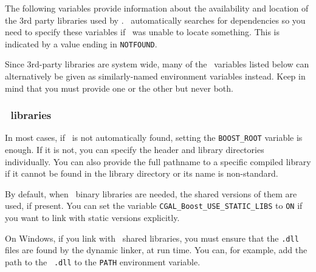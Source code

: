 The following variables provide information about the availability and
location of the 3rd party libraries used by \cgal. \cmake\ automatically
searches for dependencies so you need to specify these variables if 
\cmake\ was unable to locate something. This is indicated by a value ending in
\texttt{NOTFOUND}.

Since 3rd-party libraries are system wide, many of the \cmake\ variables listed below can alternatively
be given as similarly-named environment variables instead. Keep in mind that you must provide one or the
other but never both.

\subsubsection{\boost\ libraries}

In most cases, if \boost\ is not automatically found, setting the \texttt{BOOST\_ROOT} 
variable is enough. If it is not, you can specify the header and library
directories individually. You can also provide the full pathname to a specific compiled library
if it cannot be found in the library directory or its name is non-standard.

By default, when \boost\ binary libraries are needed, the shared versions of
them are used, if present. You can set the variable
\texttt{CGAL\_Boost\_USE\_STATIC\_LIBS} to \texttt{ON} if you want to link
with static versions explicitly.

On Windows, if you link with \boost\ shared libraries, you must ensure that
the \texttt{.dll} files are found by the dynamic linker, at run time. You
can, for example, add the path to the \boost\ \texttt{.dll} to the
\texttt{PATH} environment variable.

